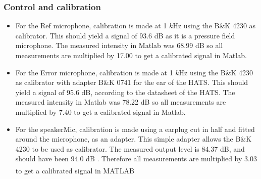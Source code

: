  
\subsubsection{Control and calibration} \label{sec:calAngInc}

\begin{itemize}
	\item For the Ref microphone, calibration is made at 1 $k$Hz using the B\&K 4230 as calibrator. This should yield a signal of 93.6 dB as it is a pressure field microphone. The measured intensity in Matlab was 68.99 dB so all measurements are multiplied by 17.00 to get a calibrated signal in Matlab. 
	\item For the Error microphone, calibration is made at 1 $k$Hz using the B\&K 4230 as calibrator with adapter B\&K 0741 for the ear of the HATS. This should yield a signal of 95.6 dB, according to the datasheet of the HATS. The measured intensity in Matlab was 78.22 dB so all measurements are multiplied by 7.40 to get a calibrated signal in Matlab. 
	\item For the speakerMic, calibration is made using a earplug cut in half and fitted around the microphone, as an adapter. This simple adapter allows the B\&K 4230 to be used as calibrator. The measured output level is 84.37 dB, and should have been 94.0 dB . Therefore all measurements are multiplied by 3.03 to get a calibrated signal in MATLAB\textsuperscript{\textregistered}
\end{itemize} 
 
